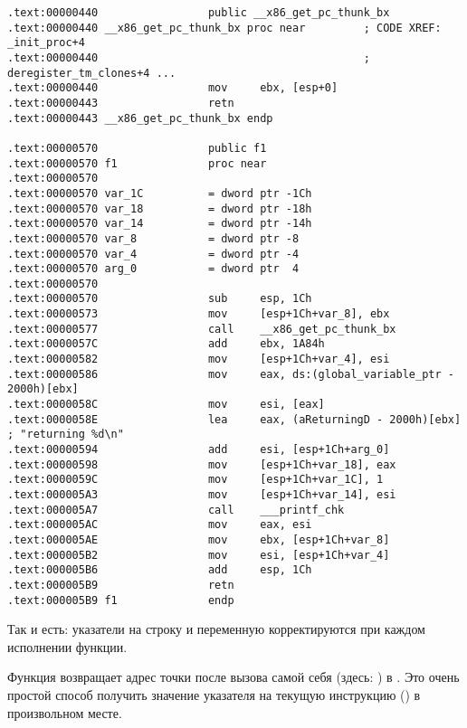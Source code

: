 \begin{lstlisting}[caption=GCC 4.7.3,style=customasmx86]
.text:00000440                 public __x86_get_pc_thunk_bx
.text:00000440 __x86_get_pc_thunk_bx proc near         ; CODE XREF: _init_proc+4
.text:00000440                                         ; deregister_tm_clones+4 ...
.text:00000440                 mov     ebx, [esp+0]
.text:00000443                 retn
.text:00000443 __x86_get_pc_thunk_bx endp

.text:00000570                 public f1
.text:00000570 f1              proc near
.text:00000570
.text:00000570 var_1C          = dword ptr -1Ch
.text:00000570 var_18          = dword ptr -18h
.text:00000570 var_14          = dword ptr -14h
.text:00000570 var_8           = dword ptr -8
.text:00000570 var_4           = dword ptr -4
.text:00000570 arg_0           = dword ptr  4
.text:00000570
.text:00000570                 sub     esp, 1Ch
.text:00000573                 mov     [esp+1Ch+var_8], ebx
.text:00000577                 call    __x86_get_pc_thunk_bx
.text:0000057C                 add     ebx, 1A84h
.text:00000582                 mov     [esp+1Ch+var_4], esi
.text:00000586                 mov     eax, ds:(global_variable_ptr - 2000h)[ebx]
.text:0000058C                 mov     esi, [eax]
.text:0000058E                 lea     eax, (aReturningD - 2000h)[ebx] ; "returning %d\n"
.text:00000594                 add     esi, [esp+1Ch+arg_0]
.text:00000598                 mov     [esp+1Ch+var_18], eax
.text:0000059C                 mov     [esp+1Ch+var_1C], 1
.text:000005A3                 mov     [esp+1Ch+var_14], esi
.text:000005A7                 call    ___printf_chk
.text:000005AC                 mov     eax, esi
.text:000005AE                 mov     ebx, [esp+1Ch+var_8]
.text:000005B2                 mov     esi, [esp+1Ch+var_4]
.text:000005B6                 add     esp, 1Ch
.text:000005B9                 retn
.text:000005B9 f1              endp
\end{lstlisting}

\newcommand{\retstring}{\IT{<<returning \%d\textbackslash{}n>>}}
\newcommand{\globvar}{\IT{global\_variable}}

Так и есть: указатели на строку \retstring{} и переменную \globvar{} корректируются при каждом исполнении функции.

\par Функция  возвращает адрес точки после вызова самой себя (здесь: ) в \EBX.
Это очень простой способ получить значение указателя на текущую инструкцию (\EIP) в произвольном месте.

